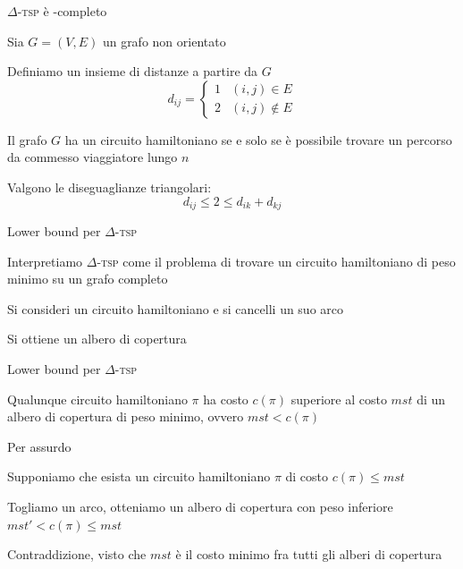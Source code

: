 \begin{frame}{$\Delta$-\textsc{tsp} è \NP-completo}

\BIL
\item Sia $G=(V,E)$ un grafo non orientato 
\item Definiamo un insieme di distanze a partire da $G$
\medskip
\[
  d_{ij} = \begin{cases}
    1 & (i,j) \in E \\
    2 & (i,j) \notin E
  \end{cases}
\]    

\item Il grafo $G$ ha un circuito hamiltoniano se e solo se è possibile
trovare un percorso da commesso viaggiatore lungo $n$
\item Valgono le diseguaglianze triangolari: 
\medskip
\[
  d_{ij} \leq 2 \leq d_{ik}+d_{kj}
\]
\EIL
\end{frame}

\begin{frame}{Lower bound per $\Delta$-\textsc{tsp}}

\BIL
\item Interpretiamo $\Delta$-\textsc{tsp} come il problema di trovare
un circuito hamiltoniano di peso minimo su un grafo completo
\item Si consideri un circuito hamiltoniano e si cancelli un suo arco
\item Si ottiene un albero di copertura
\EIL

\medskip
{}

\end{frame}

\begin{frame}{Lower bound per $\Delta$-\textsc{tsp}}

\vspace{-9pt}
\begin{myboxtitle}[Teorema]
Qualunque circuito hamiltoniano $\pi$ ha costo $c(\pi)$ superiore al costo $\mathit{mst}$ di un albero di copertura di peso minimo, ovvero $\mathit{mst} < c(\pi)$
\end{myboxtitle}    

\begin{myboxtitle}[Dimostrazione]
Per assurdo
\BIL 
\item Supponiamo che esista un circuito hamiltoniano $\pi$ di costo $c(\pi) \leq \mathit{mst}$
\item Togliamo un arco, otteniamo un albero di copertura con peso inferiore
$\mathit{mst}' < c(\pi) \leq \mathit{mst}$
\item Contraddizione, visto che $\mathit{mst}$ è il costo minimo fra tutti gli alberi di copertura 
\EIL
\end{myboxtitle}

\end{frame}

